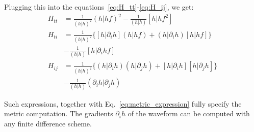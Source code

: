 \documentclass[twocolumn,showpacs,preprintnumbers,nofootinbib,prd,
superscriptaddress,10pt]{revtex4-2}
\renewcommand{\d}[1]{\ensuremath{\operatorname{d}\!{#1}}}
\newcommand{\rescalar}[2]{( #1|#2 )}
\newcommand{\imscalar}[2]{[ #1|#2 ]}
\begin{document}
Plugging this into the equations~\eqref{eq:H_tt}-\eqref{eq:H_ij}, we get:
\begin{align}
	H_{tt} &= \frac{1}{\rescalar{h}{h}^{2}} \rescalar{{h}}{{h}f}^2 - \frac{1}{\rescalar{h}{h}} \imscalar{h}{{h} f^2 } \label{eq:H_tt_grad} \\
	H_{ti} &= \frac{1}{\rescalar{h}{h}^{2}} \Big\{ \imscalar{h}{\partial_i {h}} \rescalar{{h}}{{h}f} +\rescalar{h}{\partial_i {h}} \imscalar{h}{hf} \Big\} \nonumber \\
	&- \frac{1}{\rescalar{h}{h}} \imscalar{h}{\partial_i{h} f } \label{eq:H_ti_grad} \\
	H_{ij} &=  \frac{1}{\rescalar{h}{h}^{2}} \Big\{ \rescalar{h}{\partial_i {h}} \rescalar{{h}}{\partial_j {h}} +\imscalar{h}{\partial_i {h}} \imscalar{h}{\partial_j {h}} \Big\} \nonumber \\
	&- \frac{1}{\rescalar{h}{h}} \rescalar{\partial_i h}{\partial_j {h}} \label{eq:H_ij_grad} 
\end{align}

Such expressions, together with Eq.~\eqref{eq:metric_expression} fully specify the metric computation.
The gradients $\partial_i h$ of the waveform can be computed with any finite difference scheme.





	
	
\end{document}
